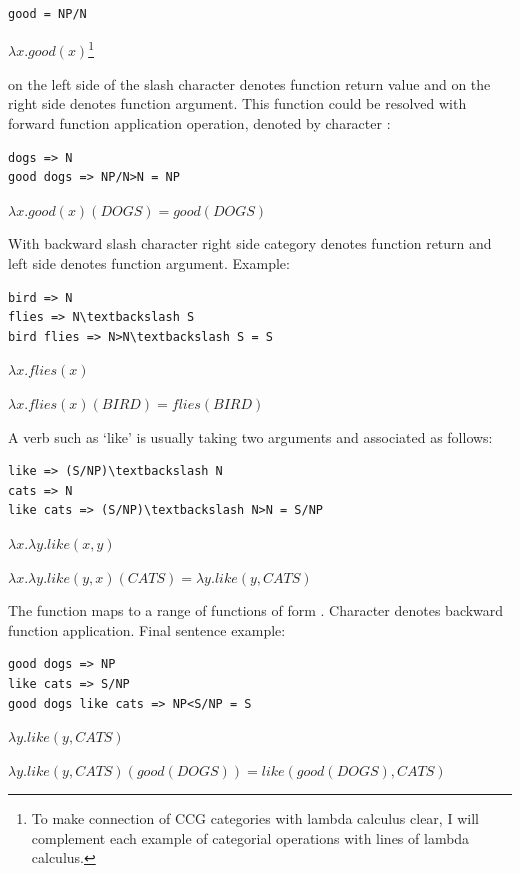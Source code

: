 \begin{verbatim}
good = NP/N 
\end{verbatim}

$\lambda x.good(x)$\footnote{To make connection of CCG categories with lambda calculus clear, I will complement each example of categorial operations with lines of lambda calculus.}

 on the left side of the slash character denotes function return value and  on the right side denotes function argument. This function could be resolved with forward function application operation, denoted by character \code{>}:

\begin{verbatim}
dogs => N
good dogs => NP/N>N = NP
\end{verbatim}

$\lambda x.good(x)(DOGS)=good(DOGS)$

With backward slash character \code{\textbackslash} right side category denotes function return and left side denotes function argument. Example:

\begin{verbatim}
bird => N
flies => N\textbackslash S
bird flies => N>N\textbackslash S = S
\end{verbatim}

$\lambda x.flies(x)$

$\lambda x.flies(x)(BIRD)=flies(BIRD) $

A verb such as ‘like’ is usually taking two arguments and associated as follows:

\begin{verbatim}
like => (S/NP)\textbackslash N
cats => N
like cats => (S/NP)\textbackslash N>N = S/NP
\end{verbatim}

$\lambda x.\lambda y.like(x, y)$

$\lambda x.\lambda y.like(y, x)(CATS)=\lambda y.like(y, CATS)$

The function  maps  to a range of functions of form .  Character \code{<} denotes backward function application. Final sentence example:

\begin{verbatim}
good dogs => NP
like cats => S/NP
good dogs like cats => NP<S/NP = S
\end{verbatim}

$\lambda y.like(y, CATS)$

$\lambda y.like(y, CATS)(good(DOGS))=like(good(DOGS), CATS)$

